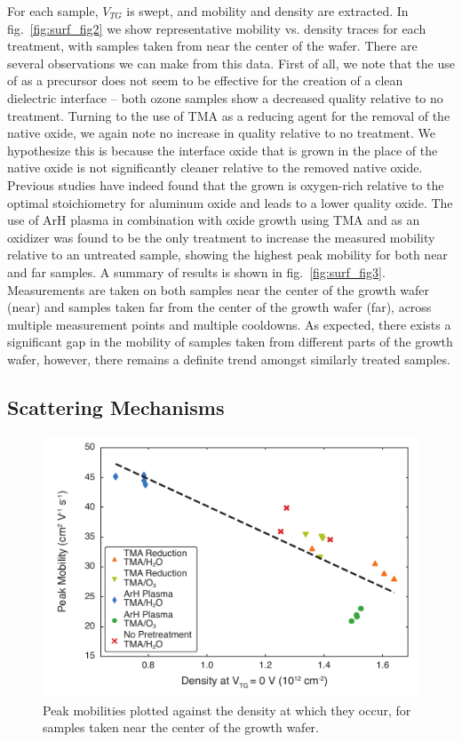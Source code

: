 For each sample, $V_{TG}$ is swept, and mobility and density are extracted. In fig.~\ref{fig:surf_fig2} we show representative mobility vs. density traces for each treatment, with samples taken from near the center of the wafer. There are several observations we can make from this data. First of all, we note that the use of  as a precursor does not seem to be effective for the creation of a clean dielectric interface -- both ozone samples show a decreased quality relative to no treatment. Turning to the use of TMA as a reducing agent for the removal of the native oxide, we again note no increase in quality relative to no treatment. We hypothesize this is because the interface oxide that is grown in the place of the native oxide is not significantly cleaner relative to the removed native oxide. Previous studies have indeed found that the  grown is oxygen-rich relative to the optimal stoichiometry for aluminum oxide and leads to a lower quality oxide\cite{ingaas_redux,10.1021/cm0608903}. The use of ArH plasma in combination with oxide growth using TMA and  as an oxidizer was found to be the only treatment to increase the measured mobility relative to an untreated sample, showing the highest peak mobility for both near and far samples. A summary of results is shown in fig.~\ref{fig:surf_fig3}. Measurements are taken on both samples near the center of the growth wafer (near) and samples taken far from the center of the growth wafer (far), across multiple measurement points and multiple cooldowns. As expected, there exists a significant gap in the mobility of samples taken from different parts of the growth wafer, however, there remains a definite trend amongst similarly treated samples.

\subsection{\label{sec:surf_scat}Scattering Mechanisms}

\begin{figure}
    \includegraphics[width=0.6\linewidth]{Figure4}
    \caption{\label{fig:surf_fig4}Peak mobilities plotted against the density at which they occur, for samples taken near the center of the growth wafer.}
\end{figure}


